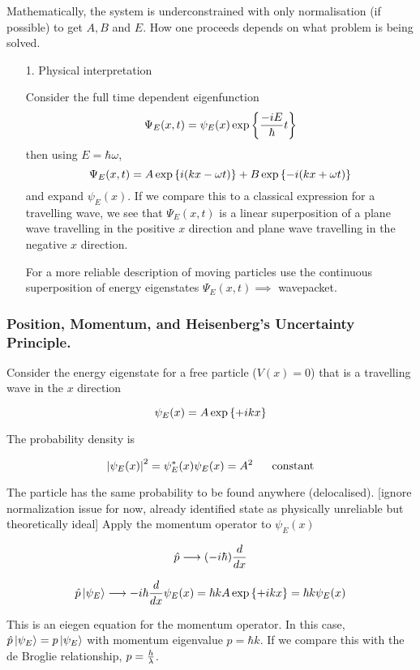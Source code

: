 \documentclass[english, 11pt]{article}
\begin{document}
    Mathematically, the system is underconstrained with only normalisation (if possible) to get $A, B$ and $E$. How one proceeds depends on what problem is being solved.

    \begin{itemize}
      \item[1.] Physical interpretation \newline

      Consider the full time dependent eigenfunction
      \[ \Psi_E(x,t) = \psi_E(x)\exp \left\{ \frac{-iE}{\hbar}t \right\} \]
      then using $E = \hbar \omega$,
      \[ \Psi_E(x,t) = A\exp \left\{ i(kx - \omega t) \right\} + B \exp \left\{ -i(kx + \omega t) \right\} \]
      and expand $\psi_E(x)$. If we compare this to a classical expression for a travelling wave, we see that $\Psi_E(x,t)$ is a linear superposition of a plane wave travelling in the positive $x$ direction and plane wave travelling in the negative $x$ direction.

      For a more reliable description of moving particles use the continuous superposition of energy eigenstates $\Psi_E(x,t) \implies$ wavepacket. \newline
    \end{itemize}
      \subsubsection{Position, Momentum, and Heisenberg's Uncertainty Principle.}

      Consider the energy eigenstate for a free particle ($V(x) = 0$) that is a travelling wave in the $x$ direction

      \[ \psi_E(x) = A\exp \left\{ +ikx \right\} \]

      The probability density is

      \[ \left|\psi_E(x)\right|^2 = \psi_E^*(x)\psi_E(x) = A^2 \ \ \ \ \ \mbox{constant} \]

      The particle has the same probability to be found anywhere (delocalised). [ignore normalization issue for now, already identified state as physically unreliable but theoretically ideal] \newline
      Apply the momentum operator to $\psi_E(x)$

      \[ \hat{p} \longrightarrow (-i\hbar)\frac{d}{dx} \]

      \[ \hat{p}\left|\psi_E\right\rangle \longrightarrow -i\hbar\frac{d}{dx}\psi_E(x) = \hbar kA\exp \left\{ +ikx \right\} = \hbar k \psi_E(x) \]

      This is an eiegen equation for the momentum operator. In this case, $\hat{p}\left|\psi_E\right\rangle = p\left|\psi_E\right\rangle$ with momentum eigenvalue $p = \hbar k$. If we compare this with the de Broglie relationship, $p=\frac{h}{\lambda}$.
\end{document}
